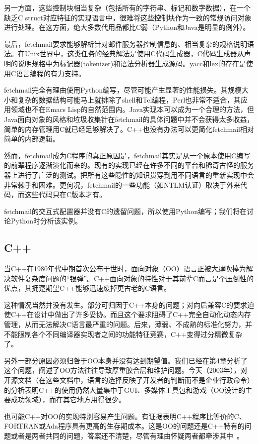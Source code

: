 \documentclass[12pt,oneside]{ctexbook}
\begin{document}
\begin{common-format}
另一方面，这些控制块相当复杂（包括所有的字符串、标记和数字数据），在一个缺乏C struct对应特征的实现语言中，很难将这些控制块作为一致的常规访问对象进行处理。在这方面，绝大多数代用品都比C弱（Python和Java是明显的例外）。

最后，fetchmail要求能够解析针对邮件服务器控制信息的、相当复杂的规格说明语法。在Unix世界中，这类任务的经典解法是使用C代码生成器，C代码生成器从声明的说明规格中为标记器(tokenizer)和语法分析器生成源码。yacc和lex的存在是使用C语言编程的有力支持。

fetchmail完全有理由使用Python编写，尽管可能产生显著的性能损失。其规模大小和复杂的数据结构可能马上就排除了shell和Tcl编程，Perl也非常不适合，其应用领域也不在Emacs Lisp的自然范围内。Java实现本可以成为一个合理的方法，但Java面向对象的风格和垃圾收集针在fetchmail的具体问题中并不会获得太多收益，简单的内存管理用C就已经足够解决了。C++也没有办法可以更简化fetchmail相对简单的内部逻辑。

然而，fetchmail成为C程序的真正原因是，fetchmail其实是从一个原本使用C编写的前辈程序逐渐演化而来的。现有的实现已经在许多不同的平台和稀奇古怪的服务器上进行了广泛的测试。把所有这些隐性的知识贯穿到用不同语言的重新实现中会非常棘手和困难。更何况，fetchmail的一些功能（如NTLM认证）取决于外来代码，而这些代码只在C版本才有。

fetchmail的交互式配置器并没有C的遗留问题，所以使用Python编写；我们将在讨论Python时分析该实例。

\subsection{C++}
当C++在1980年代中期首次公布于世时，面向对象（OO）语言正被大肆吹捧为解决软件复杂度问题的“银弹”。C++面向对象的特性对于其前辈C而言是个压倒性的优点，其拥趸期望C++能够迅速废掉更古老的C语言。

这种情况当然并没有发生。部分可归因于C++本身的问题；对向后兼容C的要求迫使C++在设计中做出了许多妥协。而且这个要求阻碍了C++完全自动化动态内存管理，从而无法解决C语言最严重的问题。后来，薄弱、不成熟的标准化努力，并不能限制各个不同编译器实现者之间的功能特征竞赛，C++变得过分精微复杂了。

另外一部分原因必须归咎于OO本身并没有达到期望值。我们已经在第4章分析了这个问题，阐述了OO方法往往导致厚重胶合层和维护问题。今天（2003年），对开源文档（在这些文档中，语言的选择反映了开发者的判断而不是企业行政命令）的分析表明C++的使用仍然大量集中于GUI、多媒体工具包和游戏（OO设计的主要成功领域），而在其它地方用得很少。

也可能C++对OO的实现特别容易产生问题。有证据表明C++程序比等价的C、FORTRAN或Ada程序具有更高的生存期成本。这是OO的问题还是C++特有的问题或者是两者共同的问题，答案还不清楚，尽管有理由怀疑两者都牵涉其中~\cite{Hatton98}。


\end{common-format}
\end{document}

